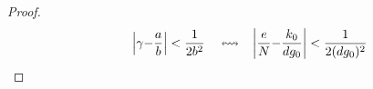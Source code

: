 \documentclass[twoside,symmetric,justified,openany,nobib]{tufte-book}
\begin{document}
\begin{proof}
  \begin{equation}
    \label{disuguaglianza-wiener}
    \hspace{20pt}\abs{\gamma{-}\frac{a}{b}} < \frac{1}{2b^2}\hspace{10pt} \leftrightsquigarrow\hspace{8pt} \abs{\frac{e}{N}{-}\frac{k_0}{dg_0}} < \frac{1}{2(dg_0)^2}
  \end{equation}
  

\end{proof}
\end{document}
